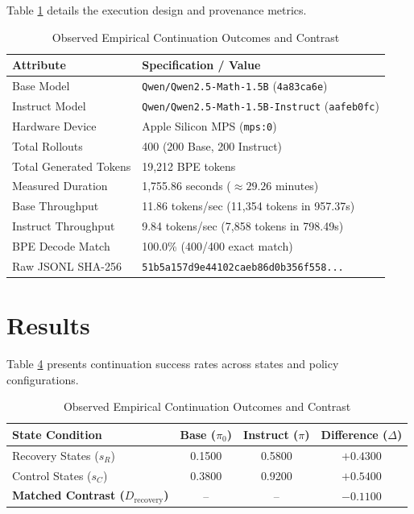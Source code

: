 \documentclass[10pt,conference,letterpaper]{IEEEtran}
\begin{document}
\begin{table}[htbp]
Table \ref{tab:provenance} details the execution design and provenance metrics.

\begin{table}[htbp]
\caption{Evaluation Design and Provenance Statistics}
\label{tab:provenance}
\centering
\begin{tabular}{lp{5.2cm}}
\toprule
\textbf{Attribute} & \textbf{Specification / Value} \\
\midrule
Base Model & \texttt{Qwen/Qwen2.5-Math-1.5B} (\texttt{4a83ca6e}) \\
Instruct Model & \texttt{Qwen/Qwen2.5-Math-1.5B-Instruct} (\texttt{aafeb0fc}) \\
Hardware Device & Apple Silicon MPS (\texttt{mps:0}) \\
Total Rollouts & 400 (200 Base, 200 Instruct) \\
Total Generated Tokens & 19,212 BPE tokens \\
Measured Duration & 1,755.86 seconds ($\approx 29.26$ minutes) \\
Base Throughput & 11.86 tokens/sec (11,354 tokens in 957.37s) \\
Instruct Throughput & 9.84 tokens/sec (7,858 tokens in 798.49s) \\
BPE Decode Match & 100.0\% (400/400 exact match) \\
Raw JSONL SHA-256 & \texttt{51b5a157d9e44102caeb86d0b356f558...} \\
\bottomrule
\end{tabular}
\end{table}

\section{Results}
Table \ref{tab:outcomes} presents continuation success rates across states and policy configurations.

\begin{table}[htbp]
\caption{Observed Empirical Continuation Outcomes and Contrast}
\label{tab:outcomes}
\centering
\begin{tabular}{lccc}
\toprule
\textbf{State Condition} & \textbf{Base ($\pi_0$)} & \textbf{Instruct ($\pi$)} & \textbf{Difference ($\Delta$)} \\
\midrule
Recovery States ($s_R$) & 0.1500 & 0.5800 & $+0.4300$ \\
Control States ($s_C$) & 0.3800 & 0.9200 & $+0.5400$ \\
\midrule
\textbf{Matched Contrast ($D_{\text{recovery}}$)} & -- & -- & \textbf{$-0.1100$} \\
\bottomrule
\end{tabular}
\end{table}


\end{table}
\end{document}
